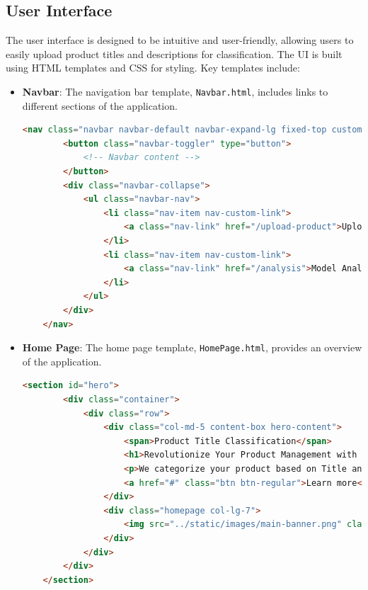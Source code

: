 \documentclass[10pt]{article}
\begin{document}
\subsection{User Interface}
The user interface is designed to be intuitive and user-friendly, allowing users to easily upload product titles and descriptions for classification. The UI is built using HTML templates and CSS for styling. Key templates include:
\begin{itemize}
    \item \textbf{Navbar}: The navigation bar template, \texttt{Navbar.html}, includes links to different sections of the application.
    \begin{lstlisting}[language=HTML]
    <nav class="navbar navbar-default navbar-expand-lg fixed-top custom-navbar">
        <button class="navbar-toggler" type="button">
            <!-- Navbar content -->
        </button>
        <div class="navbar-collapse">
            <ul class="navbar-nav">
                <li class="nav-item nav-custom-link">
                    <a class="nav-link" href="/upload-product">Upload Product</a>
                </li>
                <li class="nav-item nav-custom-link">
                    <a class="nav-link" href="/analysis">Model Analysis</a>
                </li>
            </ul>
        </div>
    </nav>
    \end{lstlisting}
    
    \item \textbf{Home Page}: The home page template, \texttt{HomePage.html}, provides an overview of the application.
    \begin{lstlisting}[language=HTML]
    <section id="hero">
        <div class="container">
            <div class="row">
                <div class="col-md-5 content-box hero-content">
                    <span>Product Title Classification</span>
                    <h1>Revolutionize Your Product Management with Smart Categorization</h1>
                    <p>We categorize your product based on Title and Description</p>
                    <a href="#" class="btn btn-regular">Learn more</a>
                </div>
                <div class="homepage col-lg-7">
                    <img src="../static/images/main-banner.png" class="img-fluid" alt="classification">
                </div>
            </div>
        </div>
    </section>
    \end{lstlisting}
    

\end{itemize}
\end{document}
